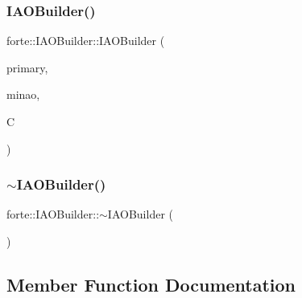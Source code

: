 \subsubsection{\texorpdfstring{I\+A\+O\+Builder()}{IAOBuilder()}}
{\footnotesize\ttfamily forte\+::\+I\+A\+O\+Builder\+::\+I\+A\+O\+Builder (\begin{DoxyParamCaption}\item[{std\+::shared\+\_\+ptr$<$ psi\+::\+Basis\+Set $>$}]{primary,  }\item[{std\+::shared\+\_\+ptr$<$ psi\+::\+Basis\+Set $>$}]{minao,  }\item[{std\+::shared\+\_\+ptr$<$ psi\+::\+Matrix $>$}]{C }\end{DoxyParamCaption})}

\mbox{\label{classforte_1_1_i_a_o_builder_a7f7ae3b24a81f83ab6495b0fecec76f5}} 
\subsubsection{\texorpdfstring{$\sim$\+I\+A\+O\+Builder()}{~IAOBuilder()}}
{\footnotesize\ttfamily forte\+::\+I\+A\+O\+Builder\+::$\sim$\+I\+A\+O\+Builder (\begin{DoxyParamCaption}{ }\end{DoxyParamCaption})\hspace{0.3cm}{\ttfamily [virtual]}}



\subsection{Member Function Documentation}
\mbox{\label{classforte_1_1_i_a_o_builder_aed0160437e3de1eebfdd5c140727501d}} 

